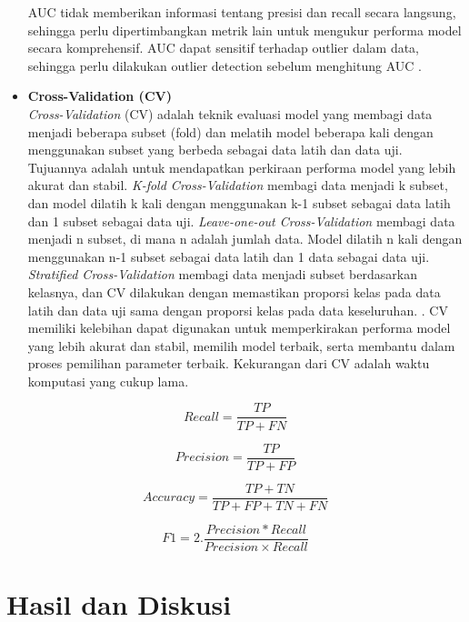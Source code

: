 \documentclass[conference]{IEEEtran}
\begin{document}
\begin{itemize}
    AUC tidak memberikan informasi tentang presisi dan recall secara langsung, sehingga perlu dipertimbangkan metrik lain untuk mengukur performa model 
    secara komprehensif. AUC dapat sensitif terhadap outlier dalam data, sehingga perlu dilakukan outlier detection sebelum menghitung AUC \cite{b49}.

    \item \textbf{Cross-Validation (CV)} \\
    \textit{Cross-Validation} (CV) adalah teknik evaluasi model yang membagi data menjadi beberapa subset (fold) dan melatih model beberapa kali dengan menggunakan subset yang berbeda sebagai data 
    latih dan data uji. Tujuannya adalah untuk mendapatkan perkiraan performa model yang lebih akurat dan stabil. \textit{K-fold Cross-Validation} membagi data menjadi k subset, dan model dilatih 
    k kali dengan menggunakan k-1 subset sebagai data latih dan 1 subset sebagai data uji. \textit{Leave-one-out Cross-Validation} membagi data menjadi n subset, di mana n adalah jumlah data. 
    Model dilatih n kali dengan menggunakan n-1 subset sebagai data latih dan 1 data sebagai data uji. \textit{Stratified Cross-Validation} membagi data menjadi subset berdasarkan kelasnya, 
    dan CV dilakukan dengan memastikan proporsi kelas pada data latih dan data uji sama dengan proporsi kelas pada data keseluruhan. \cite{b50}. 
    CV memiliki kelebihan dapat digunakan untuk memperkirakan performa model yang lebih akurat dan stabil, memilih model terbaik, serta membantu dalam proses pemilihan 
    parameter terbaik. Kekurangan dari CV adalah waktu komputasi yang cukup lama.
\end{itemize}

\begin{equation}
    Recall = \frac{TP}{TP+FN} \label{recall}
\end{equation}

\begin{equation}
    Precision = \frac{TP}{TP+FP} \label{precision}
\end{equation}

\begin{equation}
    Accuracy = \frac{TP + TN}{TP+FP+TN+FN} \label{accuracy}
\end{equation}

\begin{equation}
    F1 = 2.\frac{ Precision * Recall}{Precision \times Recall} \label{f1}
\end{equation}

\section{Hasil dan Diskusi}
\end{document}
